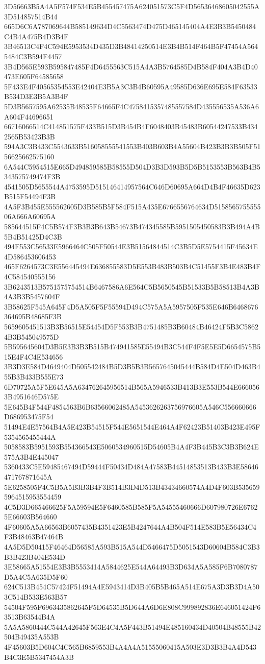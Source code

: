 {{{{{{{{{{{{{{{{{{{{{3D56663B5A4A5F574F534E5B455457475A624051573C5F4D56536468605042555A3D514857514B44
665D6C6A787069644B585149634D4C5563474D475D465145404A4E3B3B5450484C4B4A475B4D3B4F
3B46513C4F4C594E5953534D435D3B48414250514E3B4B514F464B5F47454A5645484C3B594F4457
3B4D565E593B595847485F4D6455563C515A4A3B5764585D4B584F404A3B4D40473E605F64585658
5F433E4F40565354553E42404E3B5A3C3B4B60595A49585D636E695E584F63533B534D3E3B5A3B4F
5D3B5657595A62535B48535F64665F4C4758415357485557584D435556535A536A6A604F44696651
66716066514C414851575F433B515D3B454B4F6048403B45483B60544247533B4342565B53423B3B
594A3C3B433C5543633B516058555541553B403B603B4A55604B423B3B3B505F5156625662575160
6A544C5954515E665D494859585B58555D504D3B3D593B5D5B5153553B563B4B5343575749474F3B
4541505D5655544A4753595D515146414957564C646D60695A664D4B4F46635D623B515F54494F3B
4A5F3B455E555562605D3B585B5F584F515A435E6766556764634D515856575555506A666A60695A
585644515F4C5B574F3B3B3B643B54673B474345585B5951505450583B3B494A4B5B4B51425D4C3B
494E553C56533E5966464C505F50544E3B51564844514C3B5D5E5754415F45634E4D586453606453
465F6264573C3E556445494E636855583D5E553B483B503B4C51455F3B4E483B4F4C584540555156
3B6243513B5751575754514B6467586A6E564C5B5650545B51533B5B58513B4A3B4A3B3B5457604F
3B58625F545A645F4D5A505F5F55594D494C575A5A5957505F535E646B6468676364695B48685F3B
5659605451513B3B56515E54454D5F553B3B4751485B3B60484B46424F5B3C58624B3B545049575D
5B595645604D3B5E3B3B3B515B474941585E55494B3C544F4F5E5E5D6654575B515E4F4C4E534656
3B3D3E584D4649404D505542484B5D3B5B3B5657645045444B584D4E504D463B455B3B433B555E73
6D70725A5F5E645A5A634762645956514B565A5946533B413B3E553B544E6660563B4951646D575E
5E645B4F544F4854563B6B63566062485A5453626263756976605A546C556660666D686953475F54
51494E4E57564B4A5E423B54515F544E5651544E464A4F62423B51403B423E495F5354565455444A
5058583B5951593B554366543E5060534960515D54605B4A4F3B445B3C3B3B624E575A3B4E445047
5360433C5E59485467494D59444F50434D484A47583B44514853513B433B3E58646471767871645A
5E6258505F4C5B5A5B3B3B4F3B514B3D4D513B43434660574A4D4F603B5356595964515953554459
4C5D3D665466625F5A59594E5F6460585B585F5A54555460666D607980726E67625E66603B564660
4F60605A5A66563B6057435B4351423E5B4247644A4B504F514E583B5E56434C4F3B48463B47464B
4A5D5D50415F46464D56585A593B515A544D5466475D5051543D60604B584C3B3B3B423B404E534D
3E58665A51554E3B3B5553414A5844625E544A64493B3D634A5A585F6B7080787D5A4C5A635D5F60
624C513B454C57424F51494A4E5943414D3B405B5B465A514E675A3D3B3D4A503C514B533E563B57
54504F595F6963435862645F5D64535B5D644A6D6E808C999892836E646051424F63513B63544B4A
5A5A5860444C544A42645F563E4C4A5F443B51494E485160434D40504B48555B42504B49435A553B
4F45603B5D604C4C565B6859553B4A4A4A51555060415A503E3D3B3B4A4D543B4C3E5B5347454A3B
}}}}}}}}}}}}}}}}}}}}}
